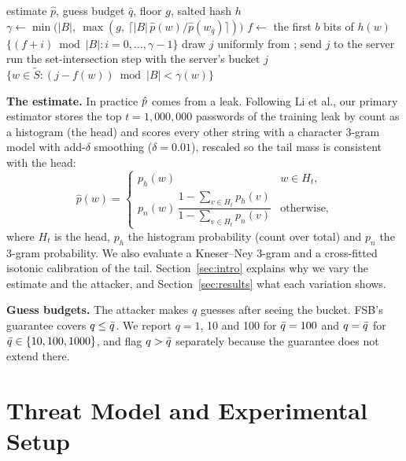\begin{algorithm}[t]
\caption{FSB with a floor $g$ ($g=1$: plain FSB). $b=\log_2|B|$.}
\label{alg:fsb}
\begin{algorithmic}[1]
\Require estimate $\hat p$, guess budget $\bar q$, floor $g$, salted hash $h$
  \State $\gamma \gets \min\bigl(|B|,\ \max(g,\ \lceil |B|\,\hat p(w)/\hat p(w_{\bar q})\rceil)\bigr)$ 
  \State $f \gets$ the first $b$ bits of $h(w)$
  \State \Return $\{(f+i) \bmod |B| : i=0,\dots,\gamma-1\}$
\EndFunction
{}
  \State draw $j$ uniformly from ; send $j$ to the server
  \State run the set-intersection step with the server's bucket $j$
\EndFunction
{} 
  \State \Return $\{w\in\tilde S : (j-f(w)) \bmod |B| < \gamma(w)\}$
\EndFunction
\end{algorithmic}
\end{algorithm}

\textbf{The estimate.} In practice $\hat p$ comes from a leak. Following Li et al., our primary estimator stores the top $t=1{,}000{,}000$ passwords of the training leak by count as a histogram (the head) and scores every other string with a character 3-gram model with add-$\delta$ smoothing ($\delta=0.01$), rescaled so the tail mass is consistent with the head:
\begin{equation}\label{eq:est}
\hat p(w)=\begin{cases} p_h(w) & w\in H_t,\\[2pt] p_n(w)\,\dfrac{1-\sum_{v\in H_t}p_h(v)}{1-\sum_{v\in H_t}p_n(v)} & \text{otherwise,}\end{cases}
\end{equation}
where $H_t$ is the head, $p_h$ the histogram probability (count over total) and $p_n$ the 3-gram probability. We also evaluate a Kneser--Ney 3-gram and a cross-fitted isotonic calibration of the tail. Section~\ref{sec:intro} explains why we vary the estimate and the attacker, and Section~\ref{sec:results} what each variation shows.

\textbf{Guess budgets.} The attacker makes $q$ guesses after seeing the bucket. FSB's guarantee covers $q\le\bar q$. We report $q=1$, 10 and 100 for $\bar q=100$ and $q=\bar q$ for $\bar q\in\{10,100,1000\}$, and flag $q>\bar q$ separately because the guarantee does not extend there.

\section{Threat Model and Experimental Setup}\label{sec:setup}


